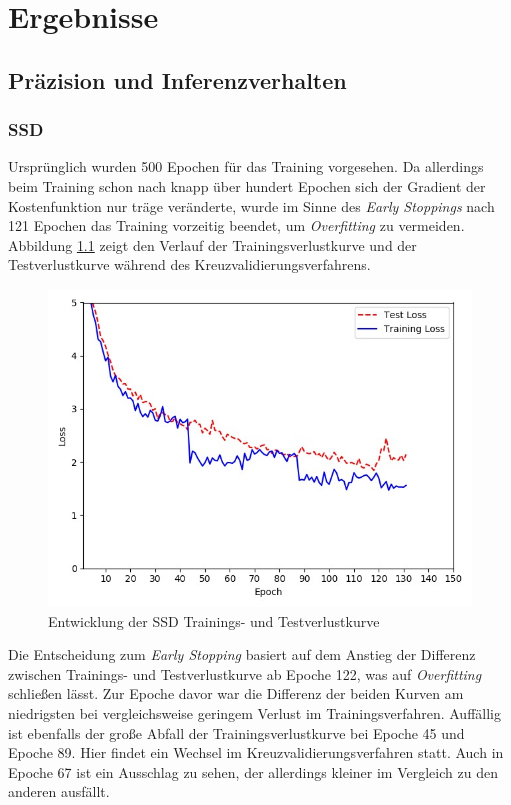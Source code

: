 \chapter{Ergebnisse}

\section{Präzision und Inferenzverhalten}

\subsection*{SSD}

Ursprünglich wurden 500 Epochen für das Training vorgesehen. Da allerdings beim Training schon nach knapp über hundert Epochen sich der Gradient der Kostenfunktion nur träge veränderte, wurde im Sinne des \textit{Early Stoppings} nach 121 Epochen das Training vorzeitig beendet, um \textit{Overfitting} zu vermeiden. Abbildung \ref{ssdloss} zeigt den Verlauf der Trainingsverlustkurve und der Testverlustkurve während des Kreuzvalidierungsverfahrens.

\begin{figure}[H]
	\begin{center}
		\includegraphics[width=15cm]{Bilder/ssdloss.jpeg} 
		\caption{Entwicklung der SSD Trainings- und Testverlustkurve}
		\label{ssdloss}
	\end{center}
\end{figure}

Die Entscheidung zum \textit{Early Stopping} basiert auf dem Anstieg der Differenz zwischen Trainings- und Testverlustkurve ab Epoche 122, was auf \textit{Overfitting} schließen lässt. Zur Epoche davor war die Differenz der beiden Kurven am niedrigsten bei vergleichsweise geringem Verlust im Trainingsverfahren. Auffällig ist ebenfalls der große Abfall der Trainingsverlustkurve bei Epoche 45 und Epoche 89. Hier findet ein Wechsel im Kreuzvalidierungsverfahren statt. Auch in Epoche 67 ist ein Ausschlag zu sehen, der allerdings kleiner im Vergleich zu den anderen ausfällt. 

